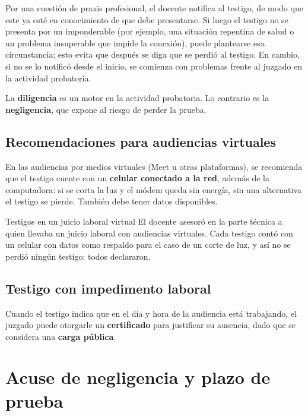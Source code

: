 \documentclass[12pt,oneside]{book}
\begin{document}
Por una cuestión de praxis profesional, el docente notifica al testigo, de modo que este ya esté en conocimiento de que debe presentarse. Si luego el testigo no se presenta por un imponderable (por ejemplo, una situación repentina de salud o un problema insuperable que impide la conexión), puede plantearse esa circunstancia; esto evita que después se diga que se perdió al testigo. En cambio, si no se lo notificó desde el inicio, se comienza con problemas frente al juzgado en la actividad probatoria.

\begin{important}
La \textbf{diligencia} es un motor en la actividad probatoria. Lo contrario es la \textbf{negligencia}, que expone al riesgo de perder la prueba.
\end{important}

\subsection{Recomendaciones para audiencias virtuales}

En las audiencias por medios virtuales (Meet u otras plataformas), se recomienda que el testigo cuente con un \textbf{celular conectado a la red}, además de la computadora: si se corta la luz y el módem queda sin energía, sin una alternativa el testigo se pierde. También debe tener datos disponibles.

\begin{example}{Testigos en un juicio laboral virtual}
El docente asesoró en la parte técnica a quien llevaba un juicio laboral con audiencias virtuales. Cada testigo contó con un celular con datos como respaldo para el caso de un corte de luz, y así no se perdió ningún testigo: todos declararon.
\end{example}

\subsection{Testigo con impedimento laboral}

Cuando el testigo indica que en el día y hora de la audiencia está trabajando, el juzgado puede otorgarle un \textbf{certificado} para justificar su ausencia, dado que se considera una \textbf{carga pública}.

\section{Acuse de negligencia y plazo de prueba}
\end{document}
